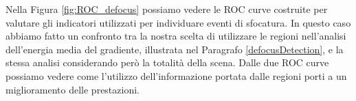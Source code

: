 Nella Figura \ref{fig:ROC_defocus} possiamo vedere le ROC curve costruite per valutare gli indicatori utilizzati per individuare eventi di sfocatura.
In questo caso abbiamo fatto un confronto tra la nostra scelta di utilizzare le regioni nell'analisi dell'energia media del gradiente, illustrata nel Paragrafo \ref{defocusDetection}, e la stessa analisi considerando per\`o la totalit\`a della scena.
Dalle due ROC curve possiamo vedere come l'utilizzo dell'informazione portata dalle regioni porti a un miglioramento delle prestazioni.
